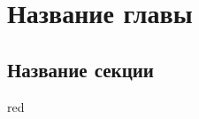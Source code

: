 \chapter{Название главы}
\label{chap2}

\section{Название секции}
\label{chap2:sec1}

\cite{REDClassification}
\ac{red}


